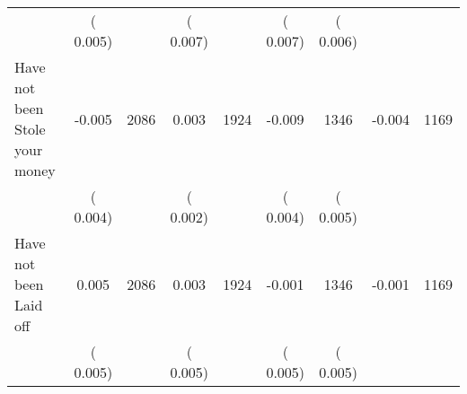 \begin{tabular}{l*{8}{c}}
                       &       (       0.005)            &                               &       (       0.007)            &                               &       (       0.007)            &       (       0.006) &                  \\
Have not been Stole your money        &             -0.005      &       2086       &              0.003      &       1924       &             -0.009      &       1346  &       -0.004 &       1169       \\
                       &       (       0.004)            &                               &       (       0.002)            &                               &       (       0.004)            &       (       0.005) &                  \\
Have not been Laid off        &              0.005      &       2086       &              0.003      &       1924       &             -0.001      &       1346  &       -0.001 &       1169       \\
                       &       (       0.005)            &                               &       (       0.005)            &                               &       (       0.005)            &       (       0.005) &                  \\
\hline \end{tabular}